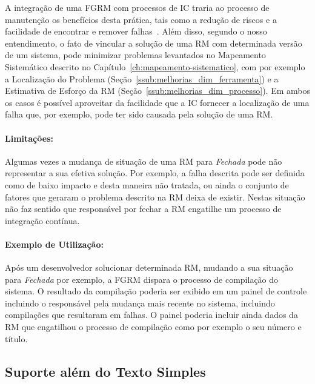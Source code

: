 A integração de uma FGRM com processos de IC traria ao processo de manutenção os
benefícios desta prática, tais como a redução de riscos e a facilidade de
encontrar e remover falhas~\cite{fowler2006continuous}.  Além disso, segundo o
nosso entendimento, o fato de vincular a solução de uma RM com determinada
versão de um sistema, pode minimizar problemas levantados no Mapeamento
Sistemático descrito no Capítulo~\ref{ch:mapeamento-sistematico}, com por
exemplo a Localização do Problema (Seção~\ref{ssub:melhorias_dim_ferramenta}) e
a Estimativa de Esforço da RM (Seção~\ref{ssub:melhorias_dim_processo}). Em
ambos os casos é possível aproveitar da facilidade que a IC fornecer a
localização de uma falha que, por exemplo, pode ter sido causada pela solução de
uma RM\@.

\paragraph{Limitações:}
\label{par:limitacoes_s05}

Algumas vezes a mudança de situação de uma RM para \textit{Fechada} pode não
representar a sua efetiva solução. Por exemplo, a falha descrita pode ser
definida como de baixo impacto e desta maneira não tratada, ou ainda o conjunto
de fatores que geraram o problema descrito na RM deixa de existir. Nestas
situação não faz sentido que responsável por fechar a RM engatilhe um processo
de integração contínua.

\paragraph{Exemplo de Utilização:}
\label{par:exemplo_de_utilização_s05}

Após um desenvolvedor solucionar determinada RM, mudando a sua situação para
\textit{Fechada} por exemplo, a FGRM dispara o processo de compilação do
sistema. O resultado da compilação poderia ser exibido em um painel de controle
incluindo o responsável pela mudança mais recente no sistema, incluindo
compilações que resultaram em falhas. O painel poderia incluir ainda dados da RM
que engatilhou o processo de compilação como por exemplo o seu número e título.

\subsection{Suporte além do Texto Simples}
\label{sub:suporte_linguagem_marcacao}


